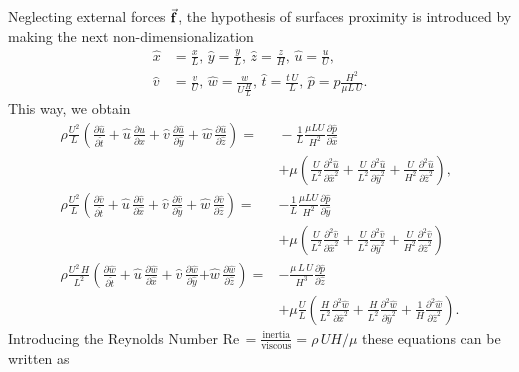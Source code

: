 Neglecting external forces $\vec{\mathbf{f}}$, the hypothesis of surfaces proximity is introduced by making the next non-dimensionalization
\begin{align}
\hat{x}&=\frac{x}{L},\,\hat{y}=\frac{y}{L},\,\hat{z}=\frac{z}{H},\,\hat{u}=\frac{u}{U},\,\label{eq:adim1}\\
\hat{v}&=\frac{v}{U},\,\hat{w}=\frac{w}{U\frac{H}{L}},\,\hat{t}=\frac{t\,U}{L},\,\hat{p}=p\frac{H^2}{\mu L\,U}.\label{eq:adim2}
\end{align}
This way, we obtain
\begin{align}
\rho\frac{U^2}{L}\left( \frac{\partial \hat{u}}{\partial \hat{t}}+ \hat{u}\, \frac{\partial \hat{u}}{\partial \hat{x}} + \hat{v}\, \frac{\partial \hat{u}}{\partial \hat{y}} +\hat{w}\, \frac{\partial \hat{u}}{\partial \hat{z}}\right)=&{}-\frac{1}{L}\frac{\mu LU}{H^2}  \frac{\partial \hat{p}}{\partial \hat{x}}\\&+
\mu\left( \frac{U}{L^2}\frac{\partial^2 \hat{u}}{\partial \hat{x}^2} + \frac{U}{L^2}\frac{\partial^2 \hat{u}}{\partial \hat{y}^2}+\frac{U}{H^2}\frac{\partial^2 \hat{u}}{\partial \hat{z}^2}\right),\nonumber\\
\rho\frac{U^2}{L} \left(\frac{\partial \hat{v}}{\partial \hat{t}}+\hat{u}\, \frac{\partial \hat{v}}{\partial \hat{x}} +\hat{v}\, \frac{\partial \hat{v}}{\partial \hat{y}} +\hat{w}\, \frac{\partial \hat{v}}{\partial \hat{z}}\right)={}&-\frac{1}{L}\frac{\mu LU}{H^2}  \frac{\partial \hat{p}}{\partial \hat{y}}\\&+
\mu\left( \frac{U}{L^2}\frac{\partial^2 \hat{v}}{\partial \hat{x}^2} + \frac{U}{L^2}\frac{\partial^2 \hat{v}}{\partial \hat{y}^2}+\frac{U}{H^2}\frac{\partial^2 \hat{v}}{\partial \hat{z}^2}\right)\nonumber\\
\rho\frac{U^2\,H}{L^2}\left( \frac{\partial \hat{w}}{\partial \hat{t}}+ \hat{u}\, \frac{\partial \hat{w}}{\partial \hat{x}} + \hat{v}\, \frac{\partial \hat{w}}{\partial \hat{y}}\right.\left.+\hat{w}\, \frac{\partial \hat{w}}{\partial \hat{z}}\right)={}&-\frac{\mu\,L\,U}{H^3}   \frac{\partial \hat{p}}{\partial \hat{z}}\\&+\mu\frac{U}{L}\left( \frac{H}{L^2}\frac{\partial^2 \hat{w}}{\partial \hat{x}^2} + \frac{H}{L^2}\frac{\partial^2 \hat{w}}{\partial \hat{y}^2}+\frac{1}{H}\frac{\partial^2 \hat{w}}{\partial \hat{z}^2}\right).\nonumber
\end{align}
Introducing the Reynolds Number Re$\,=\frac{\text{inertia}}{\text{viscous}}=\rho\,UH/\mu$ these equations can be written as
